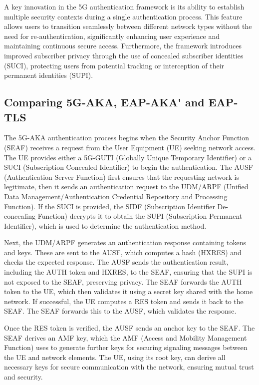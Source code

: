 A key innovation in the 5G authentication framework is its ability to establish multiple security contexts during a single authentication process. This feature allows users to transition seamlessly between different network types without the need for re-authentication, significantly enhancing user experience and maintaining continuous secure access. Furthermore, the framework introduces improved subscriber privacy through the use of concealed subscriber identities (SUCI), protecting users from potential tracking or interception of their permanent identities (SUPI).%

\subsection{Comparing \acs{5G-AKA}, \ac{EAP-AKA'} and \ac{EAP-TLS}}

The 5G-AKA authentication process begins when the Security Anchor Function (SEAF) receives a request from the User Equipment (UE) seeking network access. The UE provides either a 5G-GUTI (Globally Unique Temporary Identifier) or a SUCI (Subscription Concealed Identifier) to begin the authentication. The AUSF (Authentication Server Function) first ensures that the requesting network is legitimate, then it sends an authentication request to the UDM/ARPF (Unified Data Management/Authentication Credential Repository and Processing Function). If the SUCI is provided, the SIDF (Subscription Identifier De-concealing Function) decrypts it to obtain the SUPI (Subscription Permanent Identifier), which is used to determine the authentication method.%


Next, the UDM/ARPF generates an authentication response containing tokens and keys. These are sent to the AUSF, which computes a hash (HXRES) and checks the expected response. The AUSF sends the authentication result, including the AUTH token and HXRES, to the SEAF, ensuring that the SUPI is not exposed to the SEAF, preserving privacy. The SEAF forwards the AUTH token to the UE, which then validates it using a secret key shared with the home network. If successful, the UE computes a RES token and sends it back to the SEAF. The SEAF forwards this to the AUSF, which validates the response.

Once the RES token is verified, the AUSF sends an anchor key to the SEAF. The SEAF derives an AMF key, which the AMF (Access and Mobility Management Function) uses to generate further keys for securing signaling messages between the UE and network elements. The UE, using its root key, can derive all necessary keys for secure communication with the network, ensuring mutual trust and security.

